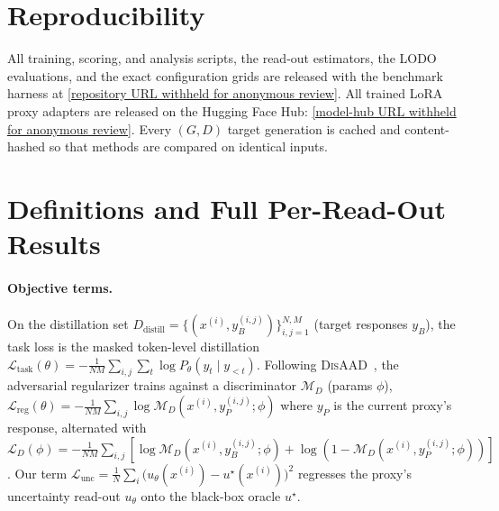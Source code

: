 \documentclass[11pt]{article}
\newcommand{\disaad}{\textsc{DisAAD}}
\begin{document}
\section*{Reproducibility}
All training, scoring, and analysis scripts, the read-out estimators, the LODO
evaluations, and the exact configuration grids are released with the benchmark harness at
\url{[repository URL withheld for anonymous review]}. All trained LoRA proxy adapters are released on the Hugging Face Hub: \url{[model-hub URL withheld for anonymous review]}. Every $(G,D)$ target generation is cached
and content-hashed so that methods are compared on identical inputs.




\appendix

\section{Definitions and Full Per-Read-Out Results}\label{app:readouts}
\paragraph{Objective terms.} On the distillation set $D_{\mathrm{distill}}=\{(x^{(i)},
y_B^{(i,j)})\}_{i,j=1}^{N,M}$ (target responses $y_B$), the task loss is the masked
token-level distillation $\mathcal{L}_{\text{task}}(\theta)=-\frac{1}{NM}\sum_{i,j}\sum_t
\log P_\theta(y_t\mid y_{<t})$. Following \disaad~\citep{cui2026disaad}, the adversarial
regularizer trains against a discriminator $\mathcal{M}_D$ (params $\phi$),
$\mathcal{L}_{\text{reg}}(\theta)=-\frac{1}{NM}\sum_{i,j}\log \mathcal{M}_D(x^{(i)},
y_P^{(i,j)};\phi)$ where $y_P$ is the current proxy's response, alternated with
$\mathcal{L}_D(\phi)=-\frac{1}{NM}\sum_{i,j}[\log\mathcal{M}_D(x^{(i)},y_B^{(i,j)};\phi)+
\log(1-\mathcal{M}_D(x^{(i)},y_P^{(i,j)};\phi))]$. Our term $\mathcal{L}_{\text{unc}}=
\frac{1}{N}\sum_i \big(u_\theta(x^{(i)})-u^\star(x^{(i)})\big)^2$ regresses the proxy's
uncertainty read-out $u_\theta$ onto the black-box oracle $u^\star$.
\end{document}
